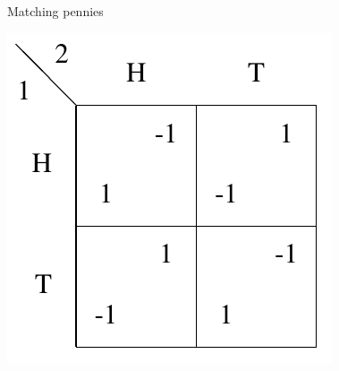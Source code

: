 \documentclass{beamer}
\begin{document}
\begin{frame}{Matching pennies}
  \begin{center}
    \includegraphics[width=\textwidth,height=0.8\textheight,keepaspectratio]{img/matching-pennies.png}
  \end{center}
\end{frame}
\end{document}
